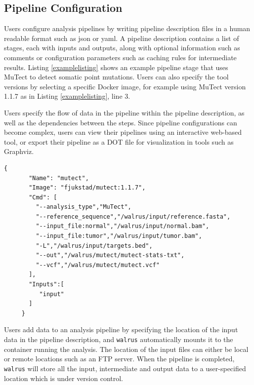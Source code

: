 \subsection{Pipeline Configuration}
Users configure analysis pipelines by writing pipeline description files in a
human readable format such as \gls{json} or \gls{yaml}. A pipeline description
contains a list of stages, each with inputs and outputs, along with optional
information such as comments or configuration parameters such as caching rules
for intermediate results. Listing \ref{examplelisting} shows an example pipeline
stage that uses MuTect\cite{mutect} to detect somatic point mutations. Users
can also specify the tool versions by selecting a specific Docker image, for
example using MuTect version 1.1.7 as in Listing \ref{examplelisting}, line 3. 

Users specify the flow of data in the pipeline within the pipeline description,
as well as the dependencies between the steps. Since pipeline configurations can
become complex, users can view their pipelines using an interactive web-based
tool, or export their pipeline as a DOT file for visualization in tools such as
Graphviz.\cite{ellson2001graphviz}

\begin{lstlisting}[caption={Example pipeline stage for a tool that detects
somatic point mutations. It reads a reference sequence file together with both
tumor and normal sequences, and produces an output file with the detected
mutations.},
label={examplelisting}, 
basicstyle=\ttfamily\scriptsize]
     {
       "Name": "mutect",
       "Image": "fjukstad/mutect:1.1.7",
       "Cmd": [
         "--analysis_type","MuTect",
         "--reference_sequence","/walrus/input/reference.fasta",
         "--input_file:normal","/walrus/input/normal.bam",
         "--input_file:tumor","/walrus/input/tumor.bam",
         "-L","/walrus/input/targets.bed",
         "--out","/walrus/mutect/mutect-stats-txt",
         "--vcf","/walrus/mutect/mutect.vcf"
       ],
       "Inputs":[
          "input" 
       ]
     }
\end{lstlisting}

Users add data to an analysis pipeline by specifying the location of the
input data in the pipeline description, and \texttt{walrus} automatically mounts
it to the container running the analysis. The location of the input files can
either be local or remote locations such as an FTP server. When the pipeline is
completed, \texttt{walrus} will store all the input, intermediate and output
data to a user-specified location which is under version control.

